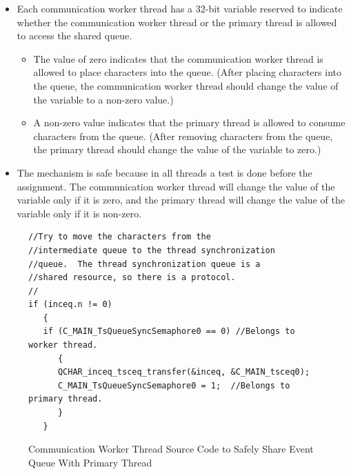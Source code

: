 \documentclass[letterpaper,10pt,titlepage]{article}
\begin{document}
\begin{itemize}
\item Each communication worker thread has a 32-bit variable reserved to
      indicate whether the communication worker thread or the primary thread
      is allowed to access the shared queue.
      \begin{itemize}
      \item The value of zero indicates that the communication worker thread
            is allowed to place characters into the queue.  (After placing
            characters into the queue, the communication worker thread should
            change the value of the variable to a non-zero value.)
      \item A non-zero value indicates that the primary thread is allowed
            to consume characters from the queue.  (After removing characters
            from the queue, the primary thread should change the value of the
            variable to zero.)
      \end{itemize}
      \item The mechanism is safe because in all threads a test is done
            before the assignment.  The communication worker thread
            will change the value of the variable only if it is zero, and
            the primary thread will change the value of the variable only
            if it is non-zero.
\end{itemize}

\begin{figure}
\centering
\begin{small}
\begin{verbatim}
//Try to move the characters from the 
//intermediate queue to the thread synchronization
//queue.  The thread synchronization queue is a 
//shared resource, so there is a protocol.
//
if (inceq.n != 0)
   {
   if (C_MAIN_TsQueueSyncSemaphore0 == 0) //Belongs to worker thread.
      {
      QCHAR_inceq_tsceq_transfer(&inceq, &C_MAIN_tsceq0);
      C_MAIN_TsQueueSyncSemaphore0 = 1;  //Belongs to primary thread.
      }
   }
\end{verbatim}
\end{small}
\caption{Communication Worker Thread Source Code to Safely Share Event Queue With Primary
         Thread}
\label{fig:sswd0:sqip0:01}
\end{figure}
\end{document}
